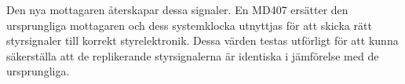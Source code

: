 \documentclass[a4paper]{article}
\begin{document}
\vspace{5mm} \noindent
Den nya mottagaren återskapar dessa signaler. En MD407 ersätter den ursprungliga mottagaren och dess systemklocka utnyttjas för att skicka rätt styrsignaler till korrekt styrelektronik. Dessa värden testas utförligt för att kunna säkerställa att de replikerande styrsignalerna är identiska i jämförelse med de ursprungliga.









%

\end{document}
